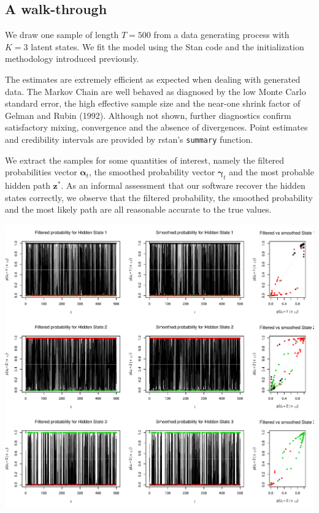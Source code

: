 \documentclass[]{article}
\newcommand{\mat}[1]{\mathbf{#1}}
\begin{document}
{{{\subsection{A walk-through}\label{a-walk-through}

We draw one sample of length \(T = 500\) from a data generating process
with \(K = 3\) latent states. We fit the model using the Stan code and
the initialization methodology introduced previously.

The estimates are extremely efficient as expected when dealing with
generated data. The Markov Chain are well behaved as diagnosed by the
low Monte Carlo standard error, the high effective sample size and the
near-one shrink factor of Gelman and Rubin (1992). Although not shown,
further diagnostics confirm satisfactory mixing, convergence and the
absence of divergences. Point estimates and credibility intervals are
provided by rstan's \texttt{summary} function.

We extract the samples for some quantities of interest, namely the
filtered probabilities vector \(\mat{\alpha}_t\), the smoothed
probability vector \(\mat{\gamma}_t\) and the most probable hidden path
\(\mat{z}^*\). As an informal assessment that our software recover the
hidden states correctly, we observe that the filtered probability, the
smoothed probability and the most likely path are all reasonable
accurate to the true values.

\includegraphics[width=\textwidth]{main_pdf_files/figure-latex/hmm_walkthrough_stateprobability-1}

}}}
\end{document}
